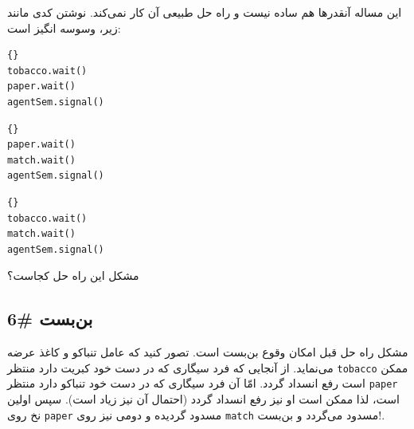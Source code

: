 \documentclass{book}
\newcommand{\clearemptydoublepage}{\newpage\cleardoublepage}
\begin{document}
    این مساله آنقدرها هم ساده نیست و راه حل طبیعی آن کار نمی‌کند. نوشتن کدی مانند زیر، وسوسه انگیز است: 
    

\begin{latin}
\begin{latin}
\begin{lstlisting}[title=\rl{سیگاری با کبریت}]{}
tobacco.wait()
paper.wait()
agentSem.signal()
\end{lstlisting}
\end{latin}

\begin{latin}
\begin{lstlisting}[title=\rl{سیگاری با تنباکو}]{}
paper.wait()
match.wait()
agentSem.signal()
\end{lstlisting}
\end{latin}

\begin{latin}
\begin{lstlisting}[title=\rl{سیگاری با کاغذ}]{}
tobacco.wait()
match.wait()
agentSem.signal()
\end{lstlisting}
\end{latin}
\end{latin}

    مشکل این  راه حل کجاست؟

\clearemptydoublepage
\subsection{بن‌بست \#6}

    مشکل راه حل قبل امکان وقوع بن‌بست است. تصور کنید که عامل تنباکو و کاغذ عرضه می‌نماید. از آنجایی که فرد  سیگاری‌ که در دست خود کبریت دارد 
    منتظر {\tt tobacco} ممکن است رفع انسداد گردد. امّا آن فرد سیگاری که در دست خود تنباکو دارد منتظر {\tt paper} است، لذا ممکن است او نیز 
    رفع انسداد گردد (احتمال آن نیز زیاد است). سپس اولین نخ روی {\tt paper} مسدود گردیده و دومی نیز روی {\tt match} مسدود می‌گردد و بن‌بست!. 
\end{document}
